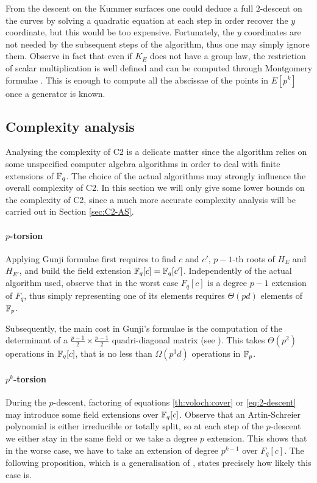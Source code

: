 From the descent on the Kummer surfaces one could deduce a full
$2$-descent on the curves by solving a quadratic equation at each step
in order recover the $y$ coordinate, but this would be too
expensive. Fortunately, the $y$ coordinates are not needed by the
subsequent steps of the algorithm, thus one may simply ignore
them. Observe in fact that even if $K_E$ does not have a group law,
the restriction of scalar multiplication is well defined and can be
computed through Montgomery formulae \cite{Mon87}. This is enough to
compute all the abscissae of the points in $E[p^k]$ once a generator
is known.


\subsection{Complexity analysis}
\label{sec:C2:complexity}
Analysing the complexity of C2 is a delicate matter since the
algorithm relies on some unspecified computer algebra algorithms in
order to deal with finite extensions of $\mathbb{F}_q$. The choice of the
actual algorithms may strongly influence the overall complexity of C2.
In this section we will only give some lower bounds on the complexity
of C2, since a much more accurate complexity analysis will be carried
out in Section \ref{sec:C2-AS}.

\paragraph{$p$-torsion}
Applying Gunji formulae first requires to find $c$ and $c'$, $p-1$-th
roots of $H_E$ and $H_{E'}$, and build the field extension $\mathbb{F}_q[c] =
\mathbb{F}_q[c']$. Independently of the actual algorithm used, observe that in
the worst case $F_q[c]$ is a degree $p-1$ extension of $F_q$, thus
simply representing one of its elements requires $\Theta(pd)$ elements
of $\mathbb{F}_p$.

Subsequently, the main cost in Gunji's formulae is the computation of
the determinant of a $\frac{p-1}{2}\times\frac{p-1}{2}$
quadri-diagonal matrix (see \cite{Gun76}). This takes $\Theta(p^2)$
operations in $\mathbb{F}_q[c]$, that is no less than $\Omega(p^3d)$
operations in $\mathbb{F}_p$.

\paragraph{$p^k$-torsion}
During the $p$-descent, factoring of equations \eqref{th:voloch:cover}
or \eqref{eq:2-descent} may introduce some field extensions over
$\mathbb{F}_q[c]$. Observe that an Artin-Schreier polynomial is either
irreducible or totally split, so at each step of the $p$-descent we
either stay in the same field or we take a degree $p$ extension. This
shows that in the worse case, we have to take an extension of degree
$p^{k-1}$ over $F_q[c]$. The following proposition, which is a
generalisation of \cite[Prop. 26]{Ler97}, states precisely how likely
this case is.

